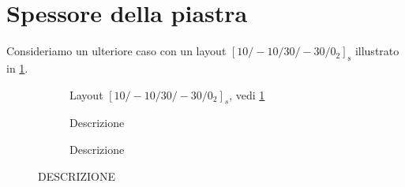 \documentclass[a4paper,num-refs]{oup-contemporary}
\begin{document}
\textcolor{blue}{\lipsum[1-2]}


\section{Spessore della piastra}
\label{sec:final_thick}
Consideriamo un ulteriore caso con un layout $[10 /-10 / 30 /-30 / 0_2]_{\mathrm{s}}$ illustrato in \cref{fig:last_case_schema}. 

\begin{figure}[bt!]
	\centering
	\begin{subfigure}[c]{0.28\textwidth}
		\centering
		\def\svgwidth{\linewidth}
	
		\caption{Layout $\left[10/-10/30/-30/0_2\right]_s$, vedi \cref{sec:final_thick}}
			\label{fig:last_case_schema}
	\end{subfigure}
	\hfill
	\begin{subfigure}[c]{0.28\textwidth}
		\centering
	\def\svgwidth{\linewidth}
		
		\caption{Descrizione}
		
	\end{subfigure}
	\hfill
	\begin{subfigure}[c]{0.35\textwidth}
		\centering
	\def\svgwidth{\linewidth}
	
		\caption{Descrizione}
		
	\end{subfigure}
	\hfill
	\caption{ DESCRIZIONE }
	\label{fig:last_case}
\end{figure}
\end{document}
